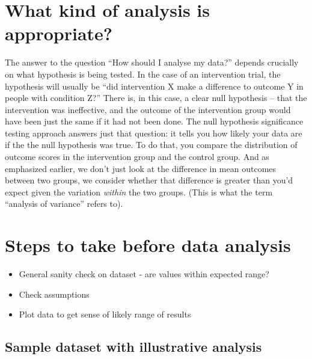 \documentclass{krantz}
\providecommand{\tightlist}{%
\setlength{\itemsep}{0pt}\setlength{\parskip}{0pt}}
\begin{document}
\hypertarget{what-kind-of-analysis-is-appropriate}{%
\section{What kind of analysis is appropriate?}\label{what-kind-of-analysis-is-appropriate}}

The answer to the question ``How should I analyse my data?'' depends crucially on what hypothesis is being tested. In the case of an intervention trial, the hypothesis will usually be ``did intervention X make a difference to outcome Y in people with condition Z?'' There is, in this case, a clear null hypothesis -- that the intervention was ineffective, and the outcome of the intervention group would have been just the same if it had not been done. The null hypothesis significance testing approach answers just that question: it tells you how likely your data are if the the null hypothesis was true. To do that, you compare the distribution of outcome scores in the intervention group and the control group. And as emphasized earlier, we don't just look at the difference in mean outcomes between two groups, we consider whether that difference is greater than you'd expect given the variation \emph{within} the two groups. (This is what the term ``analysis of variance'' refers to).

\hypertarget{steps-to-take-before-data-analysis}{%
\section{Steps to take before data analysis}\label{steps-to-take-before-data-analysis}}

\begin{itemize}
\tightlist
\item
  General sanity check on dataset - are values within expected range?
\item
  Check assumptions
\item
  Plot data to get sense of likely range of results
\end{itemize}

\hypertarget{sample-dataset-with-illustrative-analysis}{%
\subsection{Sample dataset with illustrative analysis}\label{sample-dataset-with-illustrative-analysis}}
\end{document}
